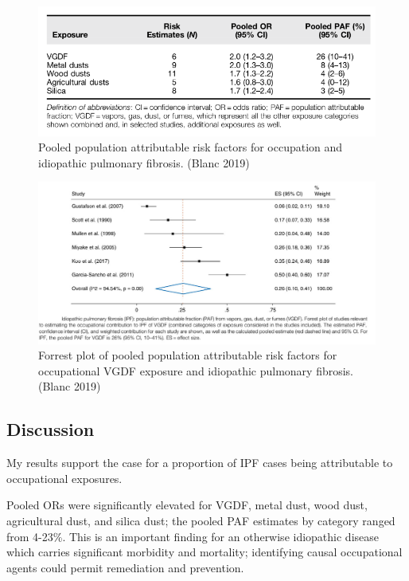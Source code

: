 \documentclass[
]{article}
\begin{document}
\begin{figure}
\centering
\includegraphics{source/figures/paf.png}
\caption{Pooled population attributable risk factors for occupation and
idiopathic pulmonary fibrosis. (Blanc 2019)}
\end{figure}

\begin{figure}
\centering
\includegraphics{source/figures/forrest.jpg}
\caption{Forrest plot of pooled population attributable risk factors for
occupational VGDF exposure and idiopathic pulmonary fibrosis. (Blanc
2019)}
\end{figure}

\hypertarget{discussion}{%
\subsection{Discussion}\label{discussion}}

My results support the case for a proportion of IPF cases being
attributable to occupational exposures.

Pooled ORs were significantly elevated for VGDF, metal dust, wood dust,
agricultural dust, and silica dust; the pooled PAF estimates by category
ranged from 4-23\%. This is an important finding for an otherwise
idiopathic disease which carries significant morbidity and mortality;
identifying causal occupational agents could permit remediation and
prevention.
\end{document}
